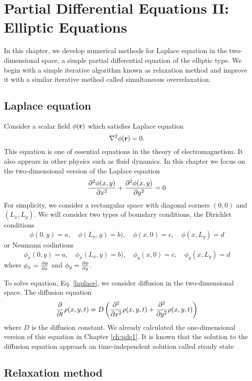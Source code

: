\chapter{Partial Differential Equations II: Elliptic Equations}\label{ch:pde-heat}

In this chapter, we develop numerical methods for Laplace equation in the two-dimensional space, a simple partial differential equation of the elliptic type. We begin with a simple iterative algorithm known as relaxation method and improve it with a similar iterative method called simultaneous overrelaxation.

\section{Laplace equation}

Consider a scalar field $\phi(\vb{r})$ which satisfies Laplace equation
\begin{equation}\label{eq:laplace}
\laplacian \phi(\vb{r}) = 0.
\end{equation}
This equation is one of essential equations in the theory of electromagnetism.  It also appears in other physics such as fluid dynamics.  In this chapter we focus on the two-dimensional version of the Laplace equation
\begin{equation}
\pdv[2]{\phi(x,y)}{x} + \pdv[2]{\phi(x,y)}{y} = 0
\end{equation}
For simplicity, we consider a rectangular space with diagonal corners $(0,0)$ and $(L_x,L_y)$.
We will consider two types of boundary conditions,  the Dirichlet conditions
\begin{equation}
\phi(0,y)=a, \quad \phi(L_x,y) = b), \quad \phi(x,0) = c, \quad \phi(x,L_y) = d
\end{equation}
or Neumann codintions
\begin{equation}
\phi_x(0,y)=a, \quad \phi_x(L_x,y) = b), \quad \phi_y(x,0) = c, \quad \phi_y(x,L_y) = d
\end{equation}
where $\phi_x = \pdv{\phi}{x}$ and $\phi_y = \pdv{\phi}{y}$.


To solve equation, Eq. \eqref{laplace}, we consider diffusion in the two-dimensional space.  The diffusion equation
\begin{equation}
\pdv{t} \rho(x,y,t) = D \left( \pdv[2]{x} \rho(x,y,t) + \pdv[2]{y} \rho(x,y,t) \right)
\end{equation}
where $D$ is the diffusion constant.  We already calculated the one-dimensional version of this equation in Chapter \ref{ch:pde1}.
It is known that the solution to the diffusion equation approach an time-independent solution called steady state

\section{Relaxation method}